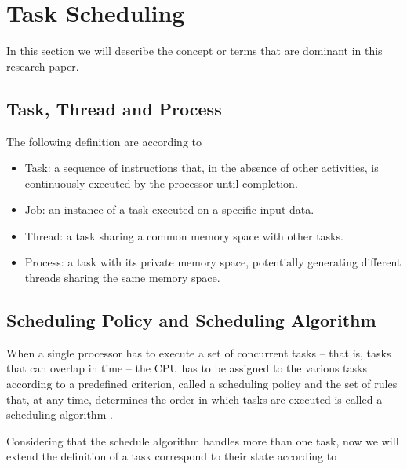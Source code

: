 
\section{Task Scheduling}
In this section we will describe the concept or terms that are dominant in this research paper.

\subsection{Task, Thread and Process}

The following definition are according to \cite{b4}

\begin{itemize}
\item Task: a sequence of instructions that, in the absence of other activities, is continuously executed by the processor until completion.
\item Job: an instance of a task executed on a specific input data.
\item Thread: a task sharing a common memory space with other tasks.
\item Process: a task with its private memory space, potentially generating different threads sharing the same memory space.
\end{itemize}


\subsection{Scheduling Policy and Scheduling Algorithm }

When a single processor has to execute a set of concurrent tasks – that is, tasks that
can overlap in time – the CPU has to be assigned to the various tasks according to
a predefined criterion, called a scheduling policy and the set of rules that, at any time,
determines the order in which tasks are executed is called a scheduling algorithm \cite{b5}.


Considering that the schedule algorithm handles more than one task, now we will extend the definition of a task correspond to their state according to \cite{b5}


